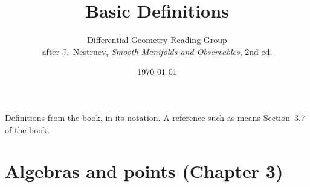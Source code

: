 \newcommand{\Spm}{\operatorname{Spm}}
\newcommand{\Inv}{\operatorname{Inv}}
\newcommand{\Ker}{\operatorname{Ker}}
\newcommand{\res}[2]{#1|_{#2}}          %
\newcommand{\env}[1]{\overline{#1}}     %
\newcommand{\HH}{\mathbb{H}}            %

\title{Basic Definitions}
\author{Differential Geometry Reading Group\\[2pt]
  \small after J.~Nestruev, \emph{Smooth Manifolds and Observables}, 2nd ed.}
\date{\today}


\maketitle

\noindent
Definitions from the book, in its notation. A reference such as 
means Section~3.7 of the book.

\tableofcontents


\section{Algebras and points (Chapter 3)}



